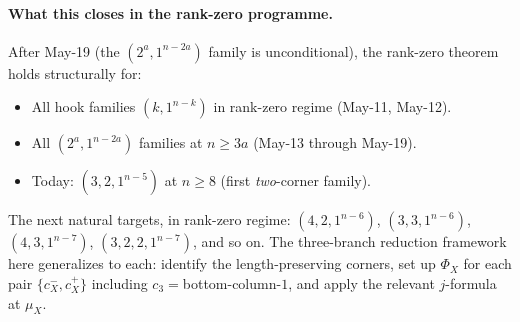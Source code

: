 \documentclass[11pt]{article}
\theoremstyle{definition}
\begin{document}
\paragraph{What this closes in the rank-zero programme.}
After May-19 (the $(2^a,1^{n-2a})$ family is unconditional), the
rank-zero theorem holds structurally for:
\begin{itemize}[leftmargin=2em,topsep=0.3em,itemsep=0.2em]
\item All hook families $(k,1^{n-k})$ in rank-zero regime
(May-11, May-12).
\item All $(2^a,1^{n-2a})$ families at $n\ge 3a$ (May-13 through
May-19).
\item Today: $(3,2,1^{n-5})$ at $n\ge 8$ (first \emph{two}-corner family).
\end{itemize}
The next natural targets, in rank-zero regime: $(4,2,1^{n-6})$,
$(3,3,1^{n-6})$, $(4,3,1^{n-7})$, $(3,2,2,1^{n-7})$, and so on.
The three-branch reduction framework here generalizes to each:
identify the length-preserving corners, set up $\Phi_X$ for each
pair $\{c_X^-,c_X^+\}$ including $c_3=$bottom-column-$1$, and apply
the relevant $j$-formula at $\mu_X$.
\end{document}
